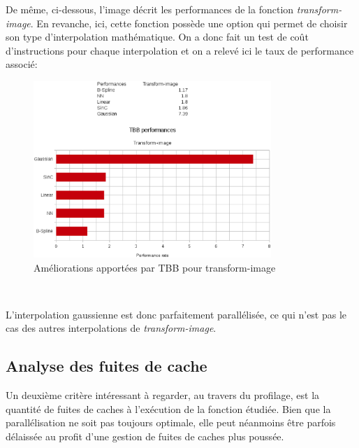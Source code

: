 \documentclass[10pt]{report}
\begin{document}
	De même, ci-dessous, l'image décrit les performances de la fonction \textit{transform-image}. En revanche, ici, cette fonction possède une option qui permet de choisir son type d'interpolation mathématique. On a donc fait un test de coût d'instructions pour chaque interpolation et on a relevé ici le taux de performance associé:
	\begin{figure}[h!]
		\begin{center}
			\includegraphics[width=9cm]{Reports/figures/performances_tbb_transform_image.eps}
		\end{center}	
		\caption{Améliorations apportées par TBB pour transform-image}
		\label{Améliorations apportées par TBB pour transform-image}
	\end{figure}~\par
	L'interpolation gaussienne est donc parfaitement parallélisée, ce qui n'est pas le cas des autres interpolations de \textit{transform-image}.
	\subsection{Analyse des fuites de cache}
	Un deuxième critère intéressant à regarder, au travers du profilage, est la quantité de fuites de caches à l'exécution de la fonction étudiée. Bien que la parallélisation ne soit pas toujours optimale, elle peut néanmoins être parfois délaissée au profit d'une gestion de fuites de caches plus poussée.
\end{document}
